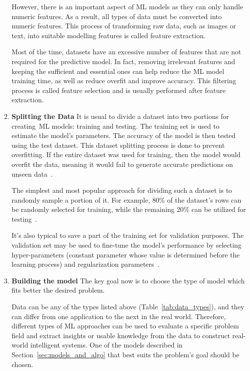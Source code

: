 \begin{enumerate}
    However, there is an important aspect of \gls{ML} models as they can only handle numeric features. As a result, all types of data must be converted into numeric features. This process of transforming raw data, such as images or text, into suitable modelling features is called feature extraction.
    
    Most of the time, datasets have an excessive number of features that are not required for the predictive model. In fact, removing irrelevant features and keeping the sufficient and essential ones can help reduce the \gls{ML} model training time, as well as reduce overfit and improve accuracy. This filtering process is called feature selection and is usually performed after feature extraction.
    
    \item \textbf{Splitting the Data} It is usual to divide a dataset into two portions for creating \gls{ML} models: training and testing. The training set is used to estimate the model's parameters. The accuracy of the model is then tested using the test dataset. This dataset splitting process is done to prevent overfitting. If the entire dataset was used for training, then the model would overfit the data, meaning it would fail to generate accurate predictions on unseen data~\cite{Joseph2020SPlit:Splitting}.
    
    The simplest and most popular approach for dividing such a dataset is to randomly sample a portion of it. For example, 80\% of the dataset's rows can be randomly selected for training, while the remaining 20\% can be utilized for testing~\cite{Joseph2020SPlit:Splitting}.
    
    It's also typical to save a part of the training set for validation purposes. The validation set may be used to fine-tune the model's performance by selecting hyper-parameters (constant parameter whose value is determined before the learning process) and regularization parameters~\cite{Joseph2020SPlit:Splitting}.
    
    \item \textbf{Building the model} The key goal now is to choose the type of model which fits better the desired problem.
    
    Data can be any of the types listed above (Table~\ref{tab:data_types}), and they can differ from one application to the next in the real world. Therefore, different types of \gls{ML} approaches can be used to evaluate a specific problem field and extract insights or usable knowledge from the data to construct real-world intelligent systems.
    One of the models described in Section~\ref{sec:models_and_algo} that best suits the problem's goal should be chosen.
    

\end{enumerate}
